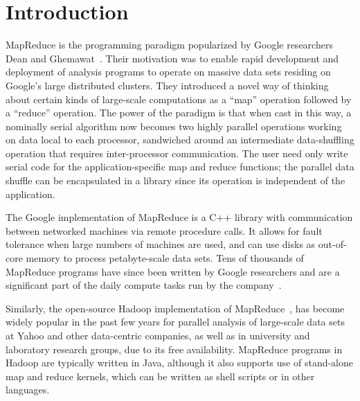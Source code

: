 \section{Introduction}
\label{sec:intro}

MapReduce is the programming paradigm popularized by Google
researchers Dean and Ghemawat~\cite{MapReduce2004}.  Their motivation was to
enable rapid development and deployment of analysis programs to
operate on massive data sets residing on Google's large distributed
clusters.  They introduced a novel way of thinking about certain kinds
of large-scale computations as a ``map'' operation followed by a
``reduce'' operation.  The power of the paradigm is that when cast in
this way, a nominally serial algorithm now becomes two highly parallel
operations working on data local to each processor, sandwiched around
an intermediate data-shuffling operation that requires inter-processor
communication.  The user need only write serial code for the
application-specific map and reduce functions; the parallel data
shuffle can be encapsulated in a library since its operation is
independent of the application.

The Google implementation of MapReduce is a C++ library with
communication between networked machines via remote procedure calls.
It allows for fault tolerance when large numbers of machines are used,
and can use disks as out-of-core memory to process petabyte-scale data
sets.  Tens of thousands of MapReduce programs have since been written
by Google researchers and are a significant part of the daily compute
tasks run by the company~\cite{MapReduce2008}.

Similarly, the open-source Hadoop implementation of MapReduce~\cite{Hadoop}, 
has become widely popular in the past few years for
parallel analysis of large-scale data sets at Yahoo and other
data-centric companies, as well as in university and laboratory
research groups, due to its free availability.  MapReduce programs in
Hadoop are typically written in Java, although it also supports use of
stand-alone map and reduce kernels, which can be written as shell
scripts or in other languages.

